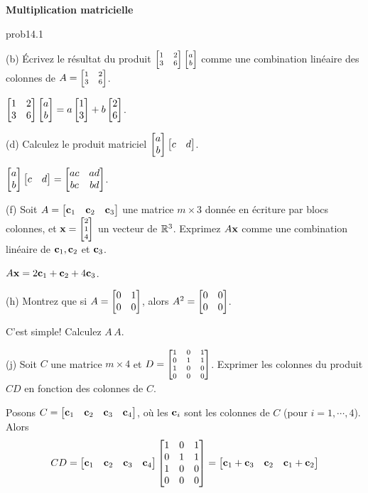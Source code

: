 

\centerline{\bf  {Multiplication matricielle}} 


\begin{sol}{prob14.1}


(b) Écrivez le résultat du produit $\scriptsize\bmatrix 1&
2\\ 3&6\endbmatrix \bmatrix a\\ b\endbmatrix$ comme une combination lin\'eaire des colonnes de $A=\scriptsize\bmatrix 1&
2\\ 3&6\endbmatrix$.

\soln $\bmatrix 1&
2\\ 3&6\endbmatrix \bmatrix a\\ b\endbmatrix = a \bmatrix 1\\ 3\endbmatrix + b \bmatrix 2\\ 6\endbmatrix $.

\medskip


(d) Calculez le produit matriciel $\bmatrix a \\ b \endbmatrix \bmatrix c&d \endbmatrix$.

\soln $\bmatrix a \\ b \endbmatrix \bmatrix c&d \endbmatrix= \bmatrix ac&ad\\ bc&bd\endbmatrix$.
\medskip 
 


(f) Soit $A=\bmatrix \cc_1&\cc_2 &\cc_3\endbmatrix$ une matrice $m\times 3$ donn\'ee en écriture par blocs colonnes, et $\xx=\scriptsize\bmatrix 2\\1\\ 4\endbmatrix$ un  vecteur de $\mathbb{R}^3$. Exprimez $A\mathbf{x}$ comme une combination lin\'eaire de $\mathbf{c}_1, \mathbf{c}_2$ et $\mathbf{c}_3$.
\medskip

\soln  
$A\mathbf{x} =2\mathbf{c}_1 + \mathbf{c}_2 + 4\mathbf{c}_3$.

\medskip 
 

(h) Montrez que si $A=
\bmatrix 0&1\\ 0&0\endbmatrix$, alors $A^2=\bmatrix0&0\cr 0&0\endbmatrix$. 

\soln C'est simple! Calculez $A\,A$.
\medskip 
 

(j) Soit $C$ une matrice $m\times 4$ et $D  =\scriptsize\bmatrix 1&0&1\\0&1&1\\ 1&0&0\\0&0&0 \endbmatrix $. Exprimer les colonnes du produit $CD$ en fonction des colonnes de $C$.

\soln Posons $C=\bmatrix \cc_1&\cc_2 &\cc_3& \cc_4\endbmatrix$, o\`u les $\mathbf{c}_i$ sont les colonnes de $C$ (pour $i=1,\cdots,4$). Alors $$CD=\bmatrix \cc_1&\cc_2 &\cc_3& \cc_4\endbmatrix \bmatrix 1&0&1\\0&1&1\\ 1&0&0\\0&0&0 \endbmatrix=\bmatrix \cc_1+\cc_3&\cc_2 &\cc_1+\cc_2\endbmatrix $$
\medskip
 


\end{sol}
